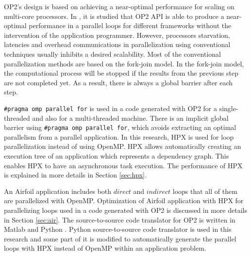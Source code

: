 \documentclass[conference]{IEEEtran}
\begin{document}
OP2's design is based on achieving a near-optimal performance for scaling on multi-core processors. In \cite{o3,o4}, it is studied that OP2 API is able to produce a near-optimal performance in a parallel loops for different frameworks without the intervention of the application programmer. However, processors starvation, latencies and overhead communications in parallelization using conventional techniques usually inhibits a desired scalability. Most of the conventional parallelization methods are based on the fork-join model. In the fork-join model, the computational process will be stopped if the results from the previous step are not completed yet. As a result, there is always a global barrier after each step. 

\texttt{\#pragma omp parallel for} is used in a code generated with OP2 for a single-threaded and also for a multi-threaded machine. There is an implicit global barrier using \texttt{\#pragma omp parallel for}, which avoids extracting an optimal parallelism from a parallel application. In this research, HPX is used for loop parallelization instead of using OpenMP.  HPX allows automatically creating an execution tree of an application which represents a dependency graph. This enables HPX to have an asynchronous task execution. The performance of HPX is explained in more details in Section \ref{sec:hpx}.                                                                                                                                                                                                                                                                                                                                                                                                                                                                                                                                                                                                                                                                                                                                                                                                                            


An Airfoil application includes both $direct$ and $indirect$ loops that all of them are parallelized with OpenMP. Optimization of Airfoil application with HPX for parallelizing loops used in a code generated with OP2 is discussed in more details in Section \ref{sec:air}. The source-to-source code translator for OP2 is written in Matlab and Python \cite{o3}. Python source-to-source code translator is used in this research and some part of it is modified to automatically generate the parallel loops with HPX instead of OpenMP within an application problem. 
\end{document}
